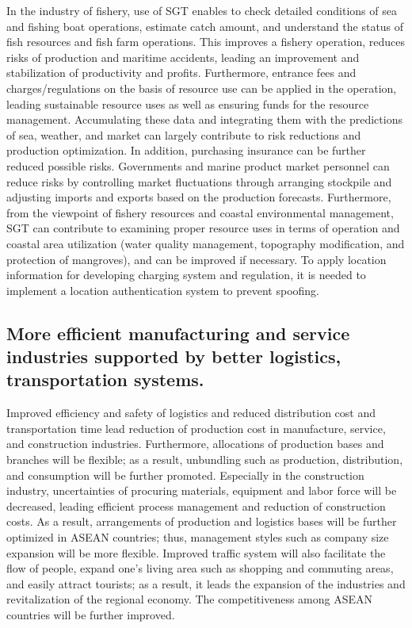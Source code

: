 \vspace{0.4 cm}

In the industry of fishery, use of SGT enables to check detailed conditions of sea and fishing boat operations, estimate catch amount, and understand the status of fish resources and fish farm operations. This improves a fishery operation, reduces risks of production and maritime accidents, leading an improvement and stabilization of productivity and profits. Furthermore, entrance fees and charges/regulations on the basis of resource use can be applied in the operation, leading sustainable resource uses as well as ensuring funds for the resource management. Accumulating these data and integrating them with the predictions of sea, weather, and market can largely contribute to risk reductions and production optimization. In addition, purchasing insurance can be further reduced possible risks. Governments and marine product market personnel can reduce risks by controlling market fluctuations through arranging stockpile and adjusting imports and exports based on the production forecasts. Furthermore, from the viewpoint of fishery resources and coastal environmental management, SGT can contribute to examining proper resource uses in terms of operation and coastal area utilization (water quality management, topography modification, and protection of mangroves), and can be improved if necessary. To apply location information for developing charging system and regulation, it is needed to implement a location authentication system to prevent spoofing.

\subsection{More efficient manufacturing and service industries supported by better logistics, transportation systems.}

\tab Improved efficiency and safety of logistics and reduced distribution cost and transportation time lead reduction of production cost in manufacture, service, and construction industries. Furthermore, allocations of production bases and branches will be flexible; as a result, unbundling such as production, distribution, and consumption will be further promoted. Especially in the construction industry, uncertainties of procuring materials, equipment and labor force will be decreased, leading efficient process management and reduction of construction costs. As a result, arrangements of production and logistics bases will be further optimized in ASEAN countries; thus, management styles such as company size expansion will be more flexible. Improved traffic system will also facilitate the flow of people, expand one’s living area such as shopping and commuting areas, and easily attract tourists; as a result, it leads the expansion of the industries and revitalization of the regional economy. The competitiveness among ASEAN countries will be further improved.

